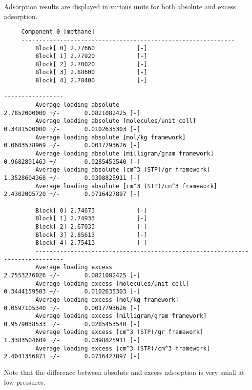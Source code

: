 \noindent
Adsorption results are displayed in various units for both absolute and excess adsorption.
\begin{tiny}
\begin{verbatim}
     Component 0 [methane]
     -------------------------------------------------------------
         Block[ 0] 2.77660            [-]
         Block[ 1] 2.77920            [-]
         Block[ 2] 2.70020            [-]
         Block[ 3] 2.88600            [-]
         Block[ 4] 2.78400            [-]
         ------------------------------------------------------------------------------
         Average loading absolute                              2.7852000000 +/-       0.0821082425 [-]
         Average loading absolute [molecules/unit cell]        0.3481500000 +/-       0.0102635303 [-]
         Average loading absolute [mol/kg framework]                  0.0603578969 +/-       0.0017793626 [-]
         Average loading absolute [milligram/gram framework]          0.9682891463 +/-       0.0285453540 [-]
         Average loading absolute [cm^3 (STP)/gr framework]           1.3528604368 +/-       0.0398825911 [-]
         Average loading absolute [cm^3 (STP)/cm^3 framework]         2.4302005720 +/-       0.0716427897 [-]

         Block[ 0] 2.74673            [-]
         Block[ 1] 2.74933            [-]
         Block[ 2] 2.67033            [-]
         Block[ 3] 2.85613            [-]
         Block[ 4] 2.75413            [-]
         ------------------------------------------------------------------------------
         Average loading excess                              2.7553276026 +/-       0.0821082425 [-]
         Average loading excess [molecules/unit cell]        0.3444159503 +/-       0.0102635303 [-]
         Average loading excess [mol/kg framework]                    0.0597105340 +/-       0.0017793626 [-]
         Average loading excess [milligram/gram framework]            0.9579038533 +/-       0.0285453540 [-]
         Average loading excess [cm^3 (STP)/gr framework]             1.3383504609 +/-       0.0398825911 [-]
         Average loading excess [cm^3 (STP)/cm^3 framework]           2.4041356871 +/-       0.0716427897 [-]
\end{verbatim}
\end{tiny}
Note that the difference between absolute and excess adsorption is very small at low pressures.

